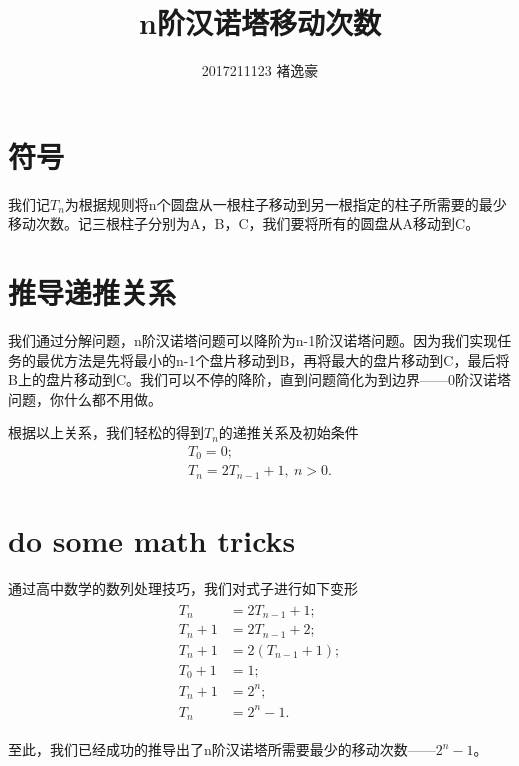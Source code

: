 \documentclass[24pt]{article}
\author{2017211123 褚逸豪}
\title{n阶汉诺塔移动次数}
\begin{document}
    \maketitle
    \section{符号}
    我们记$T_n$为根据规则将n个圆盘从一根柱子移动到另一根指定的柱子所需要的最少移动次数。记三根柱子分别为A，B，C，我们要将所有的圆盘从A移动到C。
    \section{推导递推关系}
    我们通过分解问题，n阶汉诺塔问题可以降阶为n-1阶汉诺塔问题。因为我们实现任务的最优方法是先将最小的n-1个盘片移动到B，再将最大的盘片移动到C，最后将B上的盘片移动到C。我们可以不停的降阶，直到问题简化为到边界——0阶汉诺塔问题，你什么都不用做。\par
    根据以上关系，我们轻松的得到${T_n}$的递推关系及初始条件
    $$\begin{array}{l}
        T_0=0;\\
        T_n=2T_{n-1}+1,\ n>0.
    \end{array}$$
    \section{do some math tricks}
    通过高中数学的数列处理技巧，我们对式子进行如下变形
    $$\begin{array}{l}\begin{aligned}
        T_n&=2T_{n-1}+1;\\
        T_n+1&=2T_{n-1}+2;\\
        T_n+1&=2(T_{n-1}+1);\\
        T_0+1&=1;\\
        T_n+1&=2^{n};\\
        T_n&=2^n-1.
    \end{aligned}\end{array}$$
    \par
    至此，我们已经成功的推导出了n阶汉诺塔所需要最少的移动次数——$2^n-1$。
\end{document}
